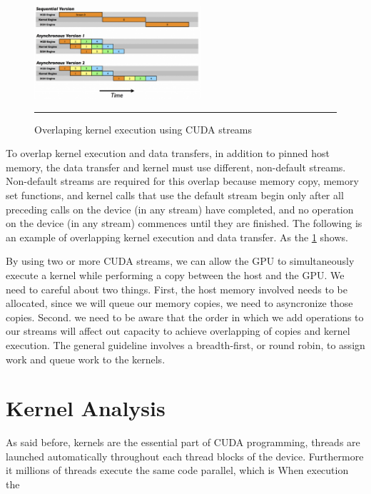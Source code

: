 \begin{figure}[htbp]
	\centering
		\includegraphics[width=0.55\textwidth]{Figures/streams.png}
		\rule{35em}{0.5pt}
	\caption[Concurent Kernels]{Overlaping kernel execution using CUDA streams}
	\label{fig:streams}
\end{figure}

To overlap kernel execution and data transfers, in addition to pinned host memory, the data transfer and kernel must use different, non-default streams. Non-default streams are required for this overlap because memory copy, memory set functions, and kernel calls that use the default stream begin only after all preceding calls on the device (in any stream) have completed, and no operation on the device (in any stream) commences until they are finished. The following is an example of overlapping kernel
execution and data transfer. As the \ref{fig:streams} shows. \cite{hwu}


By using two or more CUDA streams, we can allow the GPU to simultaneously execute a kernel while performing a copy between the host and the GPU. We need to careful about two things. First, the host memory involved needs to be allocated, since we will queue our memory copies, we need to asyncronize those copies. Second. we need to be aware that the order in which we add operations to our streams will affect out capacity to achieve overlapping of copies and kernel execution. The general guideline involves a breadth-first, or round robin, to assign work and queue work to the kernels. \cite{example}

\section{Kernel Analysis}

As said before, kernels are the essential part of CUDA programming, threads are launched automatically throughout each thread blocks of the device. Furthermore it millions of threads execute the same code parallel, which is  When execution the 

